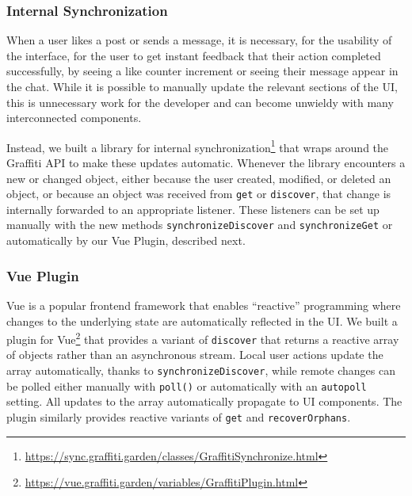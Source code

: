 \subsubsection{Internal Synchronization}

When a user likes a post or sends a message,
it is necessary, for the usability of the interface, for the user
to get instant feedback that their action completed
successfully, by seeing a like counter increment or seeing their message
appear in the chat.
While it is possible to manually update the relevant sections of the UI,
this is unnecessary work for the developer and
can become unwieldy with many interconnected components.

Instead, we built a library for internal synchronization\footnote{
  \url{https://sync.graffiti.garden/classes/GraffitiSynchronize.html}
} that wraps around the Graffiti API to make these updates automatic.
Whenever the library encounters a new or changed object, either because
the user created, modified, or deleted an object,
or because an object was received from \texttt{get}
or \texttt{discover}, that change is internally forwarded to an
appropriate listener.
These listeners can be set up manually with the new methods \texttt{synchronizeDiscover}
and \texttt{synchronizeGet} or automatically by our Vue Plugin, described next.







\subsubsection{Vue Plugin}

Vue is a popular frontend framework that enables ``reactive'' programming where
changes to the underlying state are automatically reflected in the UI.
We built a plugin for Vue\footnote{
  \url{https://vue.graffiti.garden/variables/GraffitiPlugin.html}
}
that provides a variant of
\texttt{discover} that returns a reactive array of objects rather than
an asynchronous stream.
Local user actions update the array automatically, thanks to
\texttt{synchronizeDiscover}, while remote changes
can be polled either manually with \texttt{poll()} or automatically
with an \texttt{autopoll} setting.
All updates to the array automatically propagate to UI components.
The plugin similarly provides reactive variants of \texttt{get} and
\texttt{recoverOrphans}.

